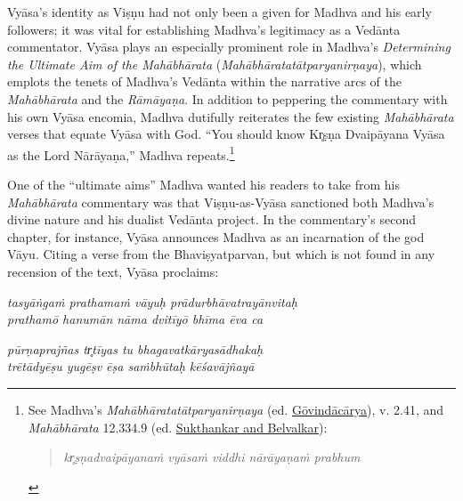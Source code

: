 Vyāsa’s identity as Viṣṇu had not only been a given for Madhva and his early followers; it was vital for establishing Madhva’s legitimacy as a Vedānta commentator. Vyāsa plays an especially prominent role in Madhva’s \emph{Determining the Ultimate Aim of the Mahābhārata} (\emph{{Mahābhāratatātparyanirṇaya}}), which emplots the tenets of Madhva’s Vedānta within the narrative arcs of the \emph{Mahābhārata} and the \emph{Rāmāyaṇa}. In addition to peppering the commentary with his own Vyāsa encomia, Madhva dutifully reiterates the few existing \emph{Mahābhārata} verses that equate Vyāsa with God. “You should know Kr̥ṣṇa Dvaipāyana Vyāsa as the Lord Nārāyaṇa,” Madhva repeats.\footnote{%
See Madhva’s \emph{{Mahābhāratatātparyanirṇaya}} (ed. \hyperref[Madhva2009]{Gōvindācārya}), v. 2.41, and \emph{Mahābhārata} 12.334.9 (ed. \hyperref[MBh]{Sukthankar and Belvalkar}):

\vspace{-1.5ex}\begin{quote}\raggedright
      \emph{kr̥ṣṇadvaipāyanaṁ vyāsaṁ viddhi nārāyaṇaṁ prabhum}\end{quote}\vspace{-1.5ex}
      }



One of the “ultimate aims” Madhva wanted his readers to take from his \emph{Mahābhārata} commentary was that Viṣṇu-as-Vyāsa sanctioned both Madhva’s divine nature and his dualist Vedānta project. In the commentary’s second chapter, for instance, Vyāsa announces Madhva as an incarnation of the god Vāyu. Citing a verse from the Bhaviṣyatparvan, but which is not found in any recension of the text, Vyāsa proclaims:

\begin{pullquote}\raggedright
      \emph{tasyāṅgaṁ prathamaṁ vāyuḥ prādurbhāvatrayānvitaḥ}\\
\emph{prathamō hanumān nāma dvitīyō bhīma ēva ca}

\emph{pūrṇaprajñas tr̥tīyas tu bhagavatkāryasādhakaḥ}\\
\emph{trētādyēṣu yugēṣv ēṣa saṁbhūtaḥ kēśavājñayā}
\end{pullquote}
      
